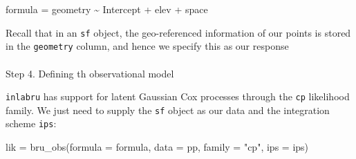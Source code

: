 \documentclass[
  letterpaper,
  DIV=11,
  numbers=noendperiod]{scrartcl}
\makeatletter
\let\oldparagraph\paragraph
\renewcommand{\paragraph}{
    \@ifstar
      \xxxParagraphStar
      \xxxParagraphNoStar
  }
\newcommand{\xxxParagraphStar}[1]{\oldparagraph*{#1}\mbox{}}
\newcommand{\xxxParagraphNoStar}[1]{\oldparagraph{#1}\mbox{}}
\newenvironment{Shaded}{\begin{snugshade}}{\end{snugshade}}
\newcommand{\AttributeTok}[1]{\textcolor[rgb]{0.40,0.45,0.13}{#1}}
\newcommand{\FunctionTok}[1]{\textcolor[rgb]{0.28,0.35,0.67}{#1}}
\newcommand{\NormalTok}[1]{\textcolor[rgb]{0.00,0.23,0.31}{#1}}
\newcommand{\OtherTok}[1]{\textcolor[rgb]{0.00,0.23,0.31}{#1}}
\newcommand{\SpecialCharTok}[1]{\textcolor[rgb]{0.37,0.37,0.37}{#1}}
\newcommand{\StringTok}[1]{\textcolor[rgb]{0.13,0.47,0.30}{#1}}
\makeatother
\begin{document}
\begin{Shaded}
\begin{Highlighting}[]
\NormalTok{formula }\OtherTok{=}\NormalTok{ geometry }\SpecialCharTok{\textasciitilde{}}\NormalTok{ Intercept  }\SpecialCharTok{+}\NormalTok{ elev }\SpecialCharTok{+}\NormalTok{ space}
\end{Highlighting}
\end{Shaded}

Recall that in an \texttt{sf} object, the geo-referenced information of
our points is stored in the \texttt{geometry} column, and hence we
specify this as our response

\paragraph{Step 4. Defining th observational
model}\label{step-4.-defining-th-observational-model}

\texttt{inlabru} has support for latent Gaussian Cox processes through
the \texttt{cp} likelihood family. We just need to supply the
\texttt{sf} object as our data and the integration scheme \texttt{ips}:

\begin{Shaded}
\begin{Highlighting}[]
\NormalTok{lik }\OtherTok{=} \FunctionTok{bru\_obs}\NormalTok{(}\AttributeTok{formula =}\NormalTok{ formula, }
              \AttributeTok{data =}\NormalTok{ pp, }
              \AttributeTok{family =} \StringTok{"cp"}\NormalTok{,}
              \AttributeTok{ips =}\NormalTok{ ips)}
\end{Highlighting}
\end{Shaded}
\end{document}

